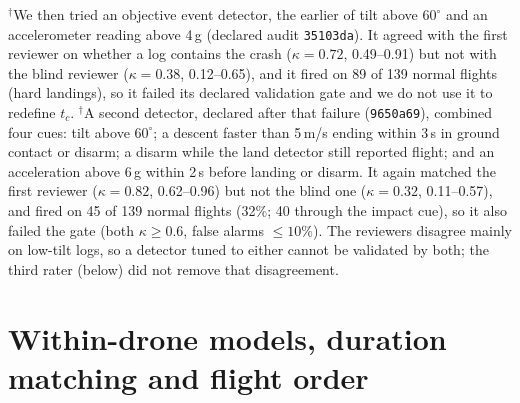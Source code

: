 \documentclass[preprint,12pt]{elsarticle}
\begin{document}
$^\dagger$We then tried an objective event detector, the earlier of tilt above $60^\circ$ and an accelerometer reading above 4\,g (declared audit \texttt{35103da}). It agreed with the first reviewer on whether a log contains the crash ($\kappa=0.72$, 0.49--0.91) but not with the blind reviewer ($\kappa=0.38$, 0.12--0.65), and it fired on 89 of 139 normal flights (hard landings), so it failed its declared validation gate and we do not use it to redefine $t_c$. $^\dagger$A second detector, declared after that failure (\texttt{9650a69}), combined four cues: tilt above $60^\circ$; a descent faster than 5\,m/s ending within 3\,s in ground contact or disarm; a disarm while the land detector still reported flight; and an acceleration above 6\,g within 2\,s before landing or disarm. It again matched the first reviewer ($\kappa=0.82$, 0.62--0.96) but not the blind one ($\kappa=0.32$, 0.11--0.57), and fired on 45 of 139 normal flights (32\%; 40 through the impact cue), so it also failed the gate (both $\kappa \ge 0.6$, false alarms $\le 10\%$). The reviewers disagree mainly on low-tilt logs, so a detector tuned to either cannot be validated by both; the third rater (below) did not remove that disagreement.
\FloatBarrier

\section{Within-drone models, duration matching and flight order}
\label{sup:within}
\end{document}
